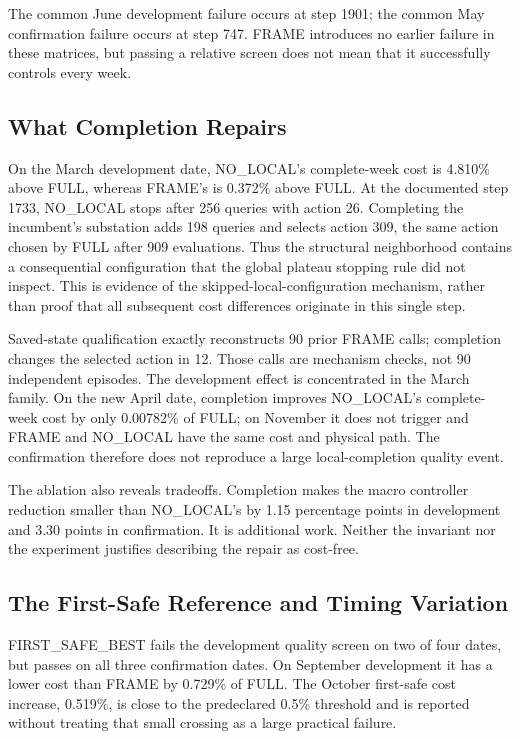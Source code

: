 \documentclass[letterpaper]{article}
\begin{document}
The common June development failure occurs at step 1901; the common May confirmation failure occurs at step 747. FRAME introduces no earlier failure in these matrices, but passing a relative screen does not mean that it successfully controls every week.


\subsection{What Completion Repairs}

On the March development date, NO\_LOCAL's complete-week cost is 4.810\% above FULL, whereas FRAME's is 0.372\% above FULL. At the documented step 1733, NO\_LOCAL stops after 256 queries with action 26. Completing the incumbent's substation adds 198 queries and selects action 309, the same action chosen by FULL after 909 evaluations. Thus the structural neighborhood contains a consequential configuration that the global plateau stopping rule did not inspect. This is evidence of the skipped-local-configuration mechanism, rather than proof that all subsequent cost differences originate in this single step.


Saved-state qualification exactly reconstructs 90 prior FRAME calls; completion changes the selected action in 12. Those calls are mechanism checks, not 90 independent episodes. The development effect is concentrated in the March family. On the new April date, completion improves NO\_LOCAL's complete-week cost by only 0.00782\% of FULL; on November it does not trigger and FRAME and NO\_LOCAL have the same cost and physical path. The confirmation therefore does not reproduce a large local-completion quality event.


The ablation also reveals tradeoffs. Completion makes the macro controller reduction smaller than NO\_LOCAL's by 1.15 percentage points in development and 3.30 points in confirmation. It is additional work. Neither the invariant nor the experiment justifies describing the repair as cost-free.


\subsection{The First-Safe Reference and Timing Variation}

FIRST\_SAFE\_BEST fails the development quality screen on two of four dates, but passes on all three confirmation dates. On September development it has a lower cost than FRAME by 0.729\% of FULL. The October first-safe cost increase, 0.519\%, is close to the predeclared 0.5\% threshold and is reported without treating that small crossing as a large practical failure.
\end{document}

